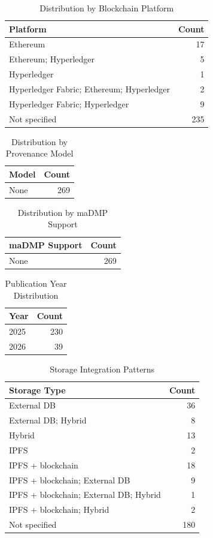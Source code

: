 \documentclass{article}
\begin{document}
\begin{table}[htbp]
\centering
\caption{Distribution by Blockchain Platform}
\begin{tabular}{lr}
\toprule
Platform & Count \\
\midrule
Ethereum & 17 \\
Ethereum; Hyperledger & 5 \\
Hyperledger & 1 \\
Hyperledger Fabric; Ethereum; Hyperledger & 2 \\
Hyperledger Fabric; Hyperledger & 9 \\
Not specified & 235 \\
\bottomrule
\end{tabular}
\end{table}

\begin{table}[htbp]
\centering
\caption{Distribution by Provenance Model}
\begin{tabular}{lr}
\toprule
Model & Count \\
\midrule
None & 269 \\
\bottomrule
\end{tabular}
\end{table}

\begin{table}[htbp]
\centering
\caption{Distribution by maDMP Support}
\begin{tabular}{lr}
\toprule
maDMP Support & Count \\
\midrule
None & 269 \\
\bottomrule
\end{tabular}
\end{table}

\begin{table}[htbp]
\centering
\caption{Publication Year Distribution}
\begin{tabular}{lr}
\toprule
Year & Count \\
\midrule
2025 & 230 \\
2026 & 39 \\
\bottomrule
\end{tabular}
\end{table}

\begin{table}[htbp]
\centering
\caption{Storage Integration Patterns}
\begin{tabular}{lr}
\toprule
Storage Type & Count \\
\midrule
External DB & 36 \\
External DB; Hybrid & 8 \\
Hybrid & 13 \\
IPFS & 2 \\
IPFS + blockchain & 18 \\
IPFS + blockchain; External DB & 9 \\
IPFS + blockchain; External DB; Hybrid & 1 \\
IPFS + blockchain; Hybrid & 2 \\
Not specified & 180 \\
\bottomrule
\end{tabular}
\end{table}
\end{document}
